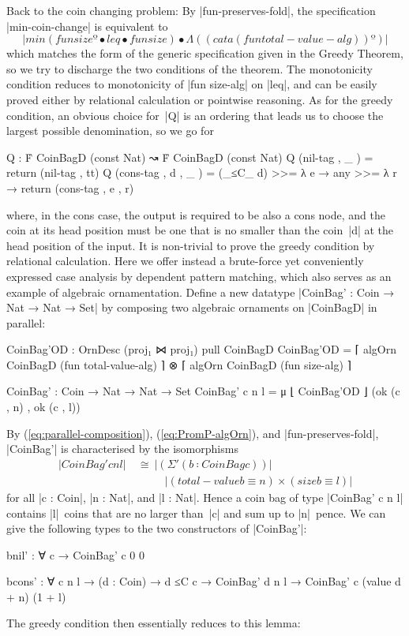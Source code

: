 Back to the coin changing problem:
By |fun-preserves-fold|, the specification |min-coin-change| is equivalent to
\[ |min (fun size º • leq • fun size) •Λ ((cata(fun total-value-alg)) º)| \]
which matches the form of the generic specification given in the Greedy Theorem, so we try to discharge the two conditions of the theorem.
The monotonicity condition reduces to monotonicity of |fun size-alg| on |leq|, and can be easily proved either by relational calculation or pointwise reasoning.
As for the greedy condition, an obvious choice for~|Q| is an ordering that leads us to choose the largest possible denomination, so we go for
\begin{code}
Q :  Ḟ CoinBagD (const Nat) ↝ Ḟ CoinBagD (const Nat)
Q (nil-tag   , _      )  =  return (nil-tag , tt)
Q (cons-tag  , d , _  )  =
  (_≤C_ d) >>= λ e → any >>= λ r → return (cons-tag , e , r)
\end{code}
where, in the cons case, the output is required to be also a cons node, and the coin at its head position must be one that is no smaller than the coin~|d| at the head position of the input.
It is non-trivial to prove the greedy condition by relational calculation.
Here we offer instead a brute-force yet conveniently expressed case analysis by dependent pattern matching, which also serves as an example of algebraic ornamentation.
Define a new datatype |CoinBag' : Coin → Nat → Nat → Set| by composing two algebraic ornaments on |CoinBagD| in parallel:
\begin{code}
CoinBag'OD : OrnDesc (proj₁ ⋈ proj₁) pull CoinBagD
CoinBag'OD =  ⌈ algOrn CoinBagD (fun total-value-alg) ⌉ ⊗
              ⌈ algOrn CoinBagD (fun size-alg) ⌉

CoinBag' : Coin → Nat → Nat → Set
CoinBag' c n l = μ ⌊ CoinBag'OD ⌋ (ok (c , n) , ok (c , l))
\end{code}
By (\ref{eq:parallel-composition}), (\ref{eq:PromP-algOrn}), and |fun-preserves-fold|, |CoinBag'| is characterised by the isomorphisms
\begin{align}
|CoinBag' c n l| &~\cong~ |(Σ'(b ∶ CoinBag c))| \nonumber \\
& \phantom{~\cong~\Sigma\,} |(total-value b ≡ n) × (size b ≡ l)| \label{eq:CoinBag'}
\end{align}
for all |c : Coin|, |n : Nat|, and |l : Nat|.
Hence a coin bag of type |CoinBag' c n l| contains |l|~coins that are no larger than~|c| and sum up to |n|~pence.
We can give the following types to the two constructors of |CoinBag'|:
\begin{code}bnil'   :  ∀ {c} → CoinBag' c 0 0

bcons'  :  ∀ {c n l} → (d : Coin) → d ≤C c →
           CoinBag' d n l → CoinBag' c (value d + n) (1 + l)
\end{code}The greedy condition then essentially reduces to this lemma:
